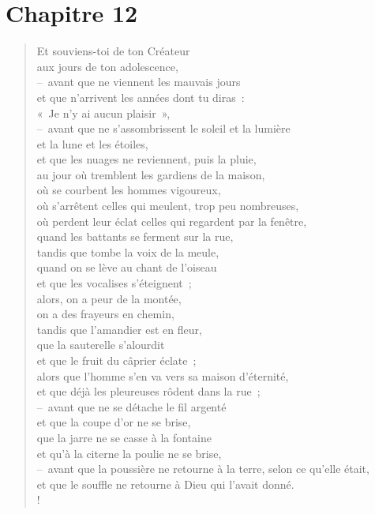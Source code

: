 \documentclass[french,twoside]{book} %
\def\mednobreak{\ifdim\lastskip<\medskipamount
  \removelastskip\nopagebreak\medskip\fi}
\newcommand{\labelblock}[1]{\medbreak{\noindent\color{rubric}\bfseries #1}\par\mednobreak}
\begin{document}
\section[{Chapitre 12}]{Chapitre 12}\renewcommand{\leftmark}{Chapitre 12}


\labelblock{La vieillesse et la mort}


\begin{verse}
Et souviens-toi de ton Créateur \\
aux jours de ton adolescence, \\
– avant que ne viennent les mauvais jours \\
et que n’arrivent les années dont tu diras : \\
« Je n’y ai aucun plaisir »,\\
– avant que ne s’assombrissent le soleil et la lumière \\
et la lune et les étoiles, \\
et que les nuages ne reviennent, puis la pluie,\\
au jour où tremblent les gardiens de la maison, \\
où se courbent les hommes vigoureux, \\
où s’arrêtent celles qui meulent, trop peu nombreuses, \\
où perdent leur éclat celles qui regardent par la fenêtre,\\
quand les battants se ferment sur la rue, \\
tandis que tombe la voix de la meule, \\
quand on se lève au chant de l’oiseau \\
et que les vocalises s’éteignent ;\\
alors, on a peur de la montée, \\
on a des frayeurs en chemin, \\
tandis que l’amandier est en fleur, \\
que la sauterelle s’alourdit \\
et que le fruit du câprier éclate ; \\
alors que l’homme s’en va vers sa maison d’éternité, \\
et que déjà les pleureuses rôdent dans la rue ;\\
– avant que ne se détache le fil argenté \\
et que la coupe d’or ne se brise, \\
que la jarre ne se casse à la fontaine \\
et qu’à la citerne la poulie ne se brise,\\
– avant que la poussière ne retourne à la terre, selon ce qu’elle était, \\
et que le souffle ne retourne à Dieu qui l’avait donné.\\!
\end{verse}
\end{document}
